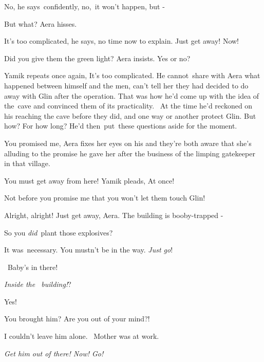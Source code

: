 \documentclass[twoside,11pt]{book}
\begin{document}
 {\textquotedbl}No,{\textquotedbl} he says{\ }confidently,
{\textquotedbl}no,{\ }it won't happen, but -{\textquotedbl}\ 

{\textquotedbl}But what?{\textquotedbl} Aera hisses. 

{\textquotedbl}It's too complicated,{\textquotedbl} he says, {\textquotedbl}no time now to explain. Just get away!
Now!{\textquotedbl} 

{\textquotedbl}Did you give them the green light?{\textquotedbl} Aera insists. {\textquotedbl}Yes or no?{\textquotedbl} 

Yamik repeats once again, {\textquotedbl}It's too complicated.{\textquotedbl} He
cannot{\ }share with Aera what happened between himself and the men, can't tell
her they had decided to do away with Glin after the operation. That was how he'd come up with the idea of the\ cave and
convinced them of its practicality. \ At the time he'd reckoned on his reaching the cave before they did, and one way
or another protect Glin. But how? For how long? He'd then~put~these questions aside for the moment. 

{\textquotedbl}You promised me,{\textquotedbl} Aera fixes her eyes on his and they're both aware that she's alluding to
the promise he gave her after the business of the limping gatekeeper in that village.

{\textquotedbl}You must get away from here!{\textquotedbl} Yamik pleads, {\textquotedbl}At
once!{\textquotedbl}~~~~~~~~~~~ 

{\textquotedbl}Not before you promise me that you won't let them touch Glin!{\textquotedbl} 

{\textquotedbl}Alright, alright! Just get away, Aera{. T}he building is
booby-trapped -{\textquotedbl} 

{\textquotedbl}So you \textit{did}{\ }plant those explosives?{\textquotedbl} 

{\textquotedbl}{I}t was{\ }necessary.
You mustn't be in the way. \textit{Just go}!{\textquotedbl}\ 

~{\textquotedbl}Baby's in there!{\textquotedbl} 

{\textquotedbl}\textit{Inside the~ building!}?{\textquotedbl} 

{\textquotedbl}Yes!{\textquotedbl} 

{\textquotedbl}You brought him? Are you out of your mind?!{\textquotedbl} 

{\textquotedbl}I couldn't leave him alone{.\ } Mother was at
work.{\textquotedbl} 

\textit{{\textquotedbl}Get him out of there! Now! Go!{\textquotedbl} }
\end{document}
